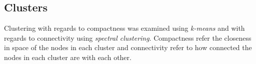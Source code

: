 

\newpage
\subsection{Clusters}\label{sec:result:clusters}

Clustering with regards to compactness was examined using \textit{k-means} and with regards to connectivity using \textit{spectral clustering}. Compactness refer the closeness in space of the nodes in each cluster and connectivity refer to how connected the nodes in each cluster are with each other.



\newpage


\newpage

